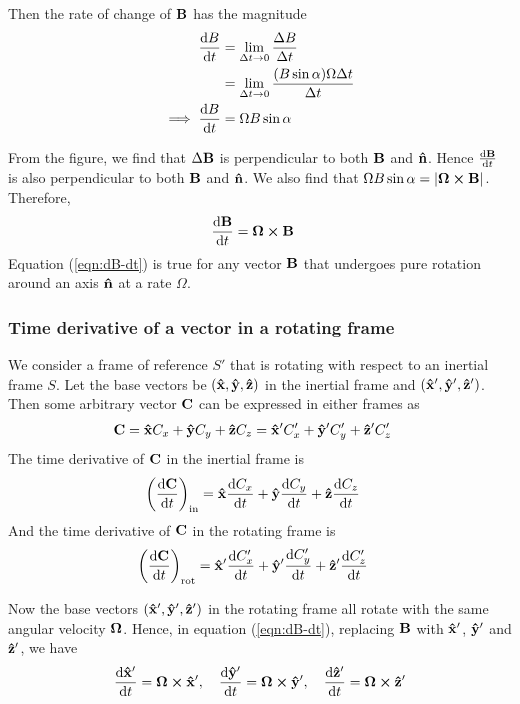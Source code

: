 			Then the rate of change of $\vb{B}$ has the magnitude
			\begin{align*}
				\dv{B}{t}&=\lim_{\Delta t\to 0}{\dfrac{\Delta B}{\Delta t}} \\
					&=\lim_{\Delta t\to 0}{\dfrac{\qty(B\sin{\alpha})\Omega\Delta t}{\Delta t}} \\
				\implies\dv{B}{t}&=\Omega B\sin{\alpha}
			\end{align*}
			
			From the figure, we find that $\Delta\vb{B}$ is perpendicular to both $\vb{B}$ and $\vu{n}$. Hence $\dv{\vb{B}}{t}$ is also perpendicular to both $\vb{B}$ and $\vu{n}$. We also find that $\Omega B\sin{\alpha}=|\vb{\Omega}\cross\vb{B}|$. Therefore,
			\begin{align}
				\dv{\vb{B}}{t}&=\vb{\Omega}\cross\vb{B} \label{eqn:dB-dt}
			\end{align}
			Equation (\ref{eqn:dB-dt}) is true for any vector $\vb{B}$ that undergoes pure rotation around an axis $\vu{n}$ at a rate $\Omega$.
			
		\subsubsection*{Time derivative of a vector in a rotating frame}
			We consider a frame of reference $S'$ that is rotating with respect to an inertial frame $S$. Let the base vectors be $(\vu{x},\vu{y},\vu{z})$ in the inertial frame and $(\vu{x}',\vu{y}',\vu{z}')$. Then some arbitrary vector $\vb{C}$ can be expressed in either frames as
			\begin{align}
				\vb{C}&=\vu{x}C_x+\vu{y}C_y+\vu{z}C_z=\vu{x}'C_x'+\vu{y}'C_y'+\vu{z}'C_z' \label{eqn:C-iner-rot}
			\end{align}
			The time derivative of $\vb{C}$ in the inertial frame is
			\begin{align}
				\qty(\dv{\vb{C}}{t})_\text{in}&=\vu{x}\dv{C_x}{t}+\vu{y}\dv{C_y}{t}+\vu{z}\dv{C_z}{t} \label{eqn:dC-dt-in}
			\end{align}
			And the time derivative of $\vb{C}$ in the rotating frame is
			\begin{align}
				\qty(\dv{\vb{C}}{t})_\text{rot}&=\vu{x}'\dv{C_x'}{t}+\vu{y}'\dv{C_y'}{t}+\vu{z}'\dv{C_z'}{t} \label{eqn:dC-dt-rot}
			\end{align}
			
			Now the base vectors $(\vu{x}',\vu{y}',\vu{z}')$ in the rotating frame all rotate with the same angular velocity $\vb{\Omega}$. Hence, in equation (\ref{eqn:dB-dt}), replacing $\vb{B}$ with $\vu{x}'$, $\vu{y}'$ and $\vu{z}'$, we have
			\begin{align}
				\dv{\vu{x}'}{t}=\vb{\Omega}\cross\vu{x}',\quad\dv{\vu{y}'}{t}=\vb{\Omega}\cross\vu{y}',\quad\dv{\vu{z}'}{t}=\vb{\Omega}\cross\vu{z}' \label{eqn:dxyz-dt}
			\end{align}
			

